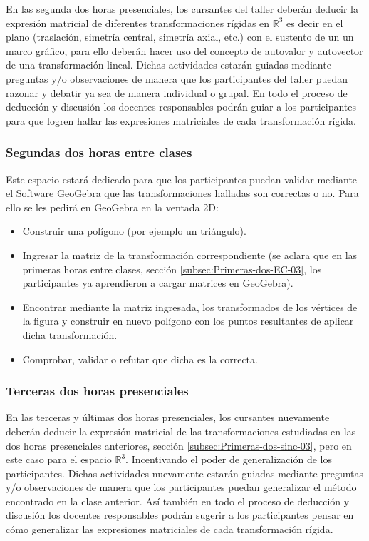 En las segunda dos horas presenciales, los cursantes del taller deberán deducir la expresión matricial de diferentes transformaciones rígidas en $\mathbb{R}^{3}$ es decir en el plano (traslación, simetría central, simetría axial, etc.) con el sustento de un un marco gráfico, para ello deberán hacer uso del concepto de autovalor y autovector de una transformación lineal. Dichas actividades estarán guiadas mediante preguntas y/o observaciones de manera que los participantes del taller puedan razonar y debatir ya sea de manera individual o grupal. En todo el proceso de deducción y discusión los docentes responsables podrán guiar a los participantes para que logren hallar las expresiones matriciales de cada transformación rígida.

\subsubsection{Segundas dos horas entre clases}

Este espacio estará dedicado para que los participantes puedan validar mediante el Software GeoGebra que las transformaciones halladas son correctas o no. Para ello se les pedirá en GeoGebra en la ventada 2D:
\begin{itemize}
	\item Construir una polígono (por ejemplo un triángulo).
	\item Ingresar la matriz de la transformación correspondiente (se aclara que en las primeras horas entre clases, sección \ref{subsec:Primeras-dos-EC-03}, los participantes ya aprendieron a cargar matrices en GeoGebra).
	\item Encontrar mediante la matriz ingresada, los transformados de los vértices de la figura y construir en nuevo polígono con los puntos resultantes de aplicar dicha transformación.
	\item Comprobar, validar o refutar que dicha es la correcta.
\end{itemize}

\subsubsection{Terceras dos horas presenciales}

En las terceras y últimas dos horas presenciales, los cursantes nuevamente deberán deducir la expresión matricial de las transformaciones estudiadas en las dos horas presenciales anteriores, sección \ref{subsec:Primeras-dos-sinc-03}, pero en este caso para el espacio $\mathbb{R}^{3}$. Incentivando el poder de generalización de los participantes. Dichas actividades nuevamente estarán guiadas mediante preguntas y/o observaciones de manera que los participantes puedan generalizar el método encontrado en la clase anterior. Así también en todo el proceso de deducción y discusión los docentes responsables podrán sugerir a los participantes pensar en cómo generalizar las expresiones matriciales de cada transformación rígida.

